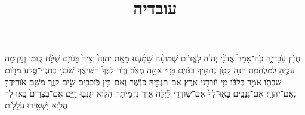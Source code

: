 \documentclass{openreader}
\title{עובדיה}
\date{}
\begin{document}
\maketitle
\raggedbottom 
\fontsize{16pt}{24pt}\selectfont


חֲזֹ֖ון עֹֽבַדְיָ֑ה כֹּֽה־אָמַר֩ אֲדֹנָ֨י יְהוִ֜ה לֶאֱדֹ֗ום שְׁמוּעָ֨ה שָׁמַ֜עְנוּ מֵאֵ֤ת יְהוָה֙ וְצִיר֙ בַּגֹּויִ֣ם שֻׁלָּ֔ח ק֛וּמוּ וְנָק֥וּמָה עָלֶ֖יהָ לַמִּלְחָמָֽה׃ 
הִנֵּ֥ה קָטֹ֛ן נְתַתִּ֖יךָ בַּגֹּויִ֑ם בָּז֥וּי אַתָּ֖ה מְאֹֽד׃ 
זְדֹ֤ון לִבְּךָ֙ הִשִּׁיאֶ֔ךָ שֹׁכְנִ֥י בְחַגְוֵי־סֶּ֖לַע מְרֹ֣ום שִׁבְתֹּ֑ו אֹמֵ֣ר בְּלִבֹּ֔ו מִ֥י יֹורִדֵ֖נִי אָֽרֶץ׃ 
אִם־תַּגְבִּ֣יהַּ כַּנֶּ֔שֶׁר וְאִם־בֵּ֥ין כֹּֽוכָבִ֖ים שִׂ֣ים קִנֶּ֑ךָ מִשָּׁ֥ם אֹורִֽידְךָ֖ נְאֻם־יְהוָֽה׃ 
אִם־גַּנָּבִ֤ים בָּאֽוּ־לְךָ֙ אִם־שֹׁ֣ודְדֵי לַ֔יְלָה אֵ֣יךְ נִדְמֵ֔יתָה הֲלֹ֥וא יִגְנְב֖וּ דַּיָּ֑ם אִם־בֹּֽצְרִים֙ בָּ֣אוּ לָ֔ךְ הֲלֹ֖וא יַשְׁאִ֥ירוּ עֹלֵלֹֽות׃ 
\end{document}
